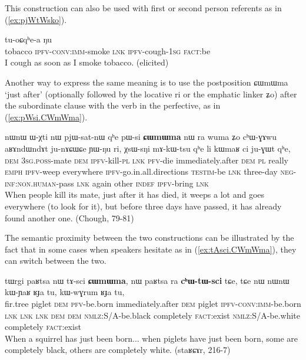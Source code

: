 \documentclass[oldfontcommands,oneside,a4paper,11pt]{article}
\newcommand{\ipa}[1]{{\phon \mbox{#1}}} %
\newcommand{\refb}[1]{(\ref{#1})}
\begin{document}
This construction can also be used with first or second person referents as in \refb{ex:pjWtWsko}.
 \begin{exe}
\ex \label{ex:pjWtWsko} 
\gll 
[\ipa{thamakʰa}   	\textbf{\ipa{pjɯ-tɯ-sko}}]   	\ipa{tɕe}   	\ipa{tu-oɕqʰe-a}   	\ipa{ŋu}   	\\
tobacco \textsc{ipfv-conv:imm}-smoke \textsc{lnk} \textsc{ipfv}-cough-\textsc{1sg} \textsc{fact}:be \\
 \glt I cough as soon as I smoke tobacco. (elicited)
\end{exe}

Another way to express the same meaning is to use the postposition \ipa{ɕɯmɯma}   `just after' (optionally followed by the locative \ipa{ri} or the emphatic linker \ipa{ʑo}) after the subordinate clause with the verb in the perfective, as in \refb{ex:pWsi.CWmWma}.

 \begin{exe}
\ex \label{ex:pWsi.CWmWma} 
\gll 
\ipa{nɯnɯ}   	\ipa{ɯ-χti}   	\ipa{nɯ}   	\ipa{pjɯ-sat-nɯ}   	\ipa{qʰe}   	\ipa{pɯ-si}   	\ipa{\textbf{ɕɯmɯma}}   	\ipa{nɯ} \ipa{ra}   	\ipa{wuma}   	\ipa{ʑo}   	\ipa{cʰɯ-ɣɤwu}   	\ipa{aʁɤndɯndɤt}   	\ipa{ju-nɤɕɯɕe}   	\ipa{ɲɯ-ŋu}   	\ipa{ri,}   	\ipa{χsɯ-sŋi}   	\ipa{mɤ-kɯ-tsu}   	\ipa{qʰe}   	\ipa{li}   	\ipa{kɯmaʁ}   	\ipa{ci}   	\ipa{ju-ɣɯt}   	\ipa{qʰe,}   \\
\textsc{dem} \textsc{3sg.poss}-mate \textsc{dem} \textsc{ipfv}-kill-\textsc{pl} \textsc{lnk} \textsc{pfv}-die  immediately.after \textsc{dem} \textsc{pl} really \textsc{emph} \textsc{ipfv}-weep everywhere \textsc{ipfv}-go.in.all.directions \textsc{testim}-be \textsc{lnk} three-day \textsc{neg-inf:non.human}-pass \textsc{lnk} again other \textsc{indef} \textsc{ipfv}-bring \textsc{lnk} \\
\glt When people kill its mate, just after it has died, it weeps a lot and goes everywhere (to look for it), but before three days have passed, it has already found another one. (Chough, 79-81)
\end{exe}

The semantic proximity between the two constructions can be illustrated by the fact that in some cases when speakers hesitate as in \refb{ex:tAsci.CWmWma}, they can switch between the two.

 \begin{exe}
\ex \label{ex:tAsci.CWmWma} 
\gll 
\ipa{tɯrgi}   	\ipa{paʁtsa}   	\ipa{nɯ}   	\ipa{tɤ-sci}   	\ipa{\textbf{ɕɯmɯma},}   
\ipa{nɯ}   	\ipa{paʁtsa}   	\ipa{ra}   	\ipa{\textbf{cʰɯ-tɯ-sci}}   	\ipa{tɕe,}   	\ipa{tɕe}   	\ipa{nɯ}   
\ipa{nɯnɯ}   	\ipa{kɯ-ɲaʁ}   	\ipa{ʁɟa}   	\ipa{tu,}   	\ipa{kɯ-wɣrum}   	\ipa{ʁɟa}   	\ipa{tu,}   \\
fir.tree piglet \textsc{dem} \textsc{pfv}-be.born immediately.after \textsc{dem} piglet \textsc{ipfv-conv:imm}-be.born \textsc{lnk} \textsc{lnk} \textsc{lnk} \textsc{dem} \textsc{dem} \textsc{nmlz}:S/A-be.black completely \textsc{fact}:exist \textsc{nmlz}:S/A-be.white completely \textsc{fact}:exist \\
\glt When a squirrel has just been born... when piglets have just been born, some are completely black, others are completely white. (staʁɕɤr, 216-7)
\end{exe}
\end{document}

